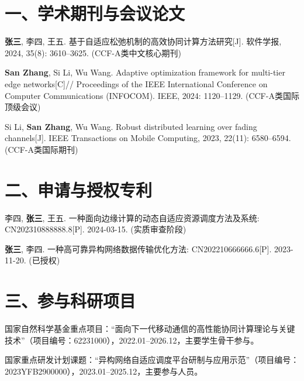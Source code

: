 
\begin{publication}

\section*{一、学术期刊与会议论文}
\begin{enumerate}[leftmargin=2.5em, itemsep=4pt, label={[\arabic*]}]
  \item \textbf{张三}, 李四, 王五. 基于自适应松弛机制的高效协同计算方法研究[J]. 软件学报, 2024, 35(8): 3610--3625. (CCF-A类中文核心期刊)
  \item \textbf{San Zhang}, Si Li, Wu Wang. Adaptive optimization framework for multi-tier edge networks[C]// Proceedings of the IEEE International Conference on Computer Communications (INFOCOM). IEEE, 2024: 1120--1129. (CCF-A类国际顶级会议)
  \item Si Li, \textbf{San Zhang}, Wu Wang. Robust distributed learning over fading channels[J]. IEEE Transactions on Mobile Computing, 2023, 22(11): 6580--6594. (CCF-A类国际期刊)
\end{enumerate}

\section*{二、申请与授权专利}
\begin{enumerate}[leftmargin=2.5em, itemsep=4pt, label={[\arabic*]}]
  \item 李四, \textbf{张三}, 王五. 一种面向边缘计算的动态自适应资源调度方法及系统: CN202310888888.8[P]. 2024-03-15. (实质审查阶段)
  \item \textbf{张三}, 李四. 一种高可靠异构网络数据传输优化方法: CN202210666666.6[P]. 2023-11-20. (已授权)
\end{enumerate}

\section*{三、参与科研项目}
\begin{enumerate}[leftmargin=2.5em, itemsep=4pt, label={[\arabic*]}]
  \item 国家自然科学基金重点项目：“面向下一代移动通信的高性能协同计算理论与关键技术”（项目编号：62231000），2022.01--2026.12，主要学生骨干参与。
  \item 国家重点研发计划课题：“异构网络自适应调度平台研制与应用示范”（项目编号：2023YFB2900000），2023.01--2025.12，主要参与人员。
\end{enumerate}

\end{publication}
